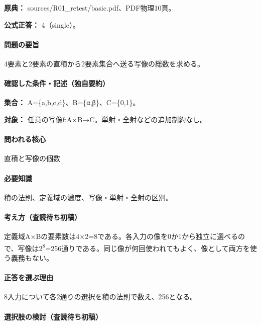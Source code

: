 \noindent\textbf{原典：} sources/R01\_retest/basic.pdf、PDF物理10頁。

\textbf{公式正答：} 4（single）。

\paragraph{問題の要旨} 4要素と2要素の直積から2要素集合へ送る写像の総数を求める。

\paragraph{確認した条件・記述（独自要約）}\mbox{}\par

\noindent\textbf{集合：} A=\{a,b,c,d\}、B=\{α,β\}、C=\{0,1\}。\par

\noindent\textbf{対象：} 任意の写像f:A×B→C。単射・全射などの追加制約なし。\par

\paragraph{問われる核心} 直積と写像の個数

\paragraph{必要知識} 積の法則、定義域の濃度、写像・単射・全射の区別。

\paragraph{考え方（査読待ち初稿）} 定義域A×Bの要素数は4×2=\allowbreak{}8である。各入力の像を0か1から独立に選べるので、写像は2\textsuperscript{8}=256通りである。同じ像が何回使われてもよく、像として両方を使う義務もない。

\paragraph{正答を選ぶ理由} 8入力について各2通りの選択を積の法則で数え、256となる。

\paragraph{選択肢の検討（査読待ち初稿）}\mbox{}\par


